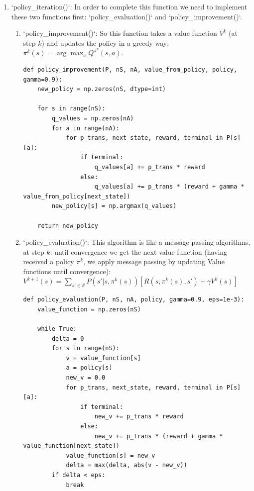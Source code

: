 \documentclass{article}
\begin{document}
\begin{enumerate}
    \item `policy\_iteration()`:
    In order to complete this function we need to implement these two functions first: `policy\_evaluation()` and `policy\_improvement()`.
    \begin{enumerate}
        \item `policy\_improvement()`: 
        So this function takes a value function $V^k$ (at step $k$) and updates the policy in a greedy way: $\pi^{k}(s) = \arg\max_a Q^{\pi^k}(s,a)$.
        \begin{lstlisting}[caption={implementation of  `policy\_improvement()`},label={lst:beat}]
def policy_improvement(P, nS, nA, value_from_policy, policy, gamma=0.9):
    new_policy = np.zeros(nS, dtype=int)

    for s in range(nS):
        q_values = np.zeros(nA)
        for a in range(nA):
            for p_trans, next_state, reward, terminal in P[s][a]:
                if terminal:
                    q_values[a] += p_trans * reward
                else:
                    q_values[a] += p_trans * (reward + gamma * value_from_policy[next_state])
        new_policy[s] = np.argmax(q_values)

    return new_policy
                \end{lstlisting}
    \item `policy\_evaluation()`:
    This algorithm is like a message passing algorithms, at step $k$: 
    until convergence we get the next value function (having received a policy $\pi^k$, we apply message passing by updating Value functions until convergence): 
    $V^{k+1}(s) = \sum_{s'\in \mathcal{S}} P(s'|s,\pi^k(s)) [R(s,\pi^k(s),s') + \gamma V^k(s) ] $
    

    \begin{lstlisting}[caption={implementation of  `policy\_evaluation()`},label={lst:beat}]
def policy_evaluation(P, nS, nA, policy, gamma=0.9, eps=1e-3):
    value_function = np.zeros(nS)

    while True:
        delta = 0
        for s in range(nS):
            v = value_function[s]
            a = policy[s]
            new_v = 0.0
            for p_trans, next_state, reward, terminal in P[s][a]:
                if terminal:
                    new_v += p_trans * reward
                else:
                    new_v += p_trans * (reward + gamma * value_function[next_state])
            value_function[s] = new_v
            delta = max(delta, abs(v - new_v))
        if delta < eps:
            break


\end{lstlisting}
\end{enumerate}
\end{enumerate}
\end{document}
